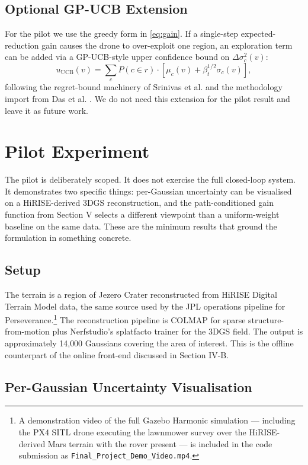 \documentclass[conference]{IEEEtran}
\begin{document}
\subsection{Optional GP-UCB Extension}
For the pilot we use the greedy form in \eqref{eq:gain}. If a single-step expected-reduction gain causes the drone to over-exploit one region, an exploration term can be added via a GP-UCB-style upper confidence bound on $\Delta\sigma^2_c(v)$:
\begin{equation}
u_{\text{UCB}}(v) = \sum_c P(c \in r) \cdot \left[\mu_c(v) + \beta_t^{1/2} \sigma_c(v)\right],
\end{equation}
following the regret-bound machinery of Srinivas et al. \cite{srinivas} and the methodology import from Das et al. \cite{das}. We do not need this extension for the pilot result and leave it as future work.

\section{Pilot Experiment}
\label{sec:pilot}
The pilot is deliberately scoped. It does not exercise the full closed-loop system. It demonstrates two specific things: per-Gaussian uncertainty can be visualised on a HiRISE-derived 3DGS reconstruction, and the path-conditioned gain function from Section V selects a different viewpoint than a uniform-weight baseline on the same data. These are the minimum results that ground the formulation in something concrete.

\subsection{Setup}
The terrain is a region of Jezero Crater reconstructed from HiRISE Digital Terrain Model data, the same source used by the JPL operations pipeline for Perseverance.\footnote{A demonstration video of the full Gazebo Harmonic simulation --- including the PX4 SITL drone executing the lawnmower survey over the HiRISE-derived Mars terrain with the rover present --- is included in the code submission as \texttt{Final\_Project\_Demo\_Video.mp4}.} The reconstruction pipeline is COLMAP for sparse structure-from-motion plus Nerfstudio's splatfacto trainer for the 3DGS field. The output is approximately 14{,}000 Gaussians covering the area of interest. This is the offline counterpart of the online front-end discussed in Section IV-B.

\subsection{Per-Gaussian Uncertainty Visualisation}
\end{document}
